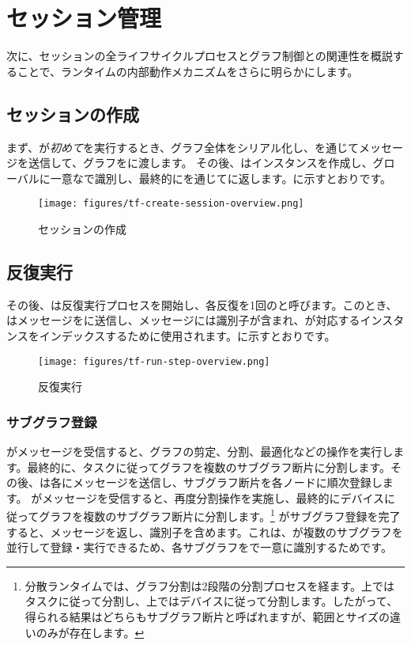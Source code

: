 \section{セッション管理}
\begin{content}
次に、セッションの全ライフサイクルプロセスとグラフ制御との関連性を概説することで、ランタイムの内部動作メカニズムをさらに明らかにします。
\subsection{セッションの作成}
まず、が\emph{初めて}を実行するとき、グラフ全体をシリアル化し、を通じてメッセージを送信して、グラフをに渡します。
その後、はインスタンスを作成し、グローバルに一意なで識別し、最終的にを通じてに返します。に示すとおりです。
\begin{figure}[!h]
\centering
\texttt{[image: figures/tf-create-session-overview.png]}
\caption{セッションの作成}
\label{fig:tf-create-session-overview}
\end{figure}
\subsection{反復実行}
その後、は反復実行プロセスを開始し、各反復を1回のと呼びます。このとき、はメッセージをに送信し、メッセージには識別子が含まれ、が対応するインスタンスをインデックスするために使用されます。に示すとおりです。
\begin{figure}[!h]
\centering
\texttt{[image: figures/tf-run-step-overview.png]}
\caption{反復実行}
\label{fig:tf-run-step-overview}
\end{figure}
\subsubsection{サブグラフ登録}
がメッセージを受信すると、グラフの剪定、分割、最適化などの操作を実行します。最終的に、タスクに従ってグラフを複数のサブグラフ断片に分割します。その後、は各にメッセージを送信し、サブグラフ断片を各ノードに順次登録します。
がメッセージを受信すると、再度分割操作を実施し、最終的にデバイスに従ってグラフを複数のサブグラフ断片に分割します。\footnote{分散ランタイムでは、グラフ分割は2段階の分割プロセスを経ます。上ではタスクに従って分割し、上ではデバイスに従って分割します。したがって、得られる結果はどちらもサブグラフ断片と呼ばれますが、範囲とサイズの違いのみが存在します。}
がサブグラフ登録を完了すると、メッセージを返し、識別子を含めます。これは、が複数のサブグラフを並行して登録・実行できるため、各サブグラフをで一意に識別するためです。

\end{content}
